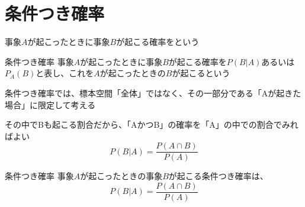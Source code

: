 \documentclass[../../../topic_probability-statistics]{subfiles}
\begin{document}
\sectionline
\section{条件つき確率}

事象$A$が起こったときに事象$B$が起こる確率をという

\begin{definition}{条件つき確率}
  事象$A$が起こったときに事象$B$が起こる確率を$P(B|A)$あるいは$P_A(B)$と表し、これを$A$が起こったときの$B$が起こるという
\end{definition}

\br

条件つき確率では、標本空間「全体」ではなく、その一部分である「Aが起きた場合」に限定して考える

その中でBも起こる割合だから、「AかつB」の確率を「A」の中での割合でみればよい
\begin{equation*}
  P(B|A) = \frac{P(A \cap B)}{P(A)}
\end{equation*}

\br

\begin{theorem}{条件つき確率}
  事象$A$が起こったときの事象$B$が起こる条件つき確率は、
  \begin{equation*}
    P(B|A) = \frac{P(A \cap B)}{P(A)}
  \end{equation*}
\end{theorem}
\end{document}
